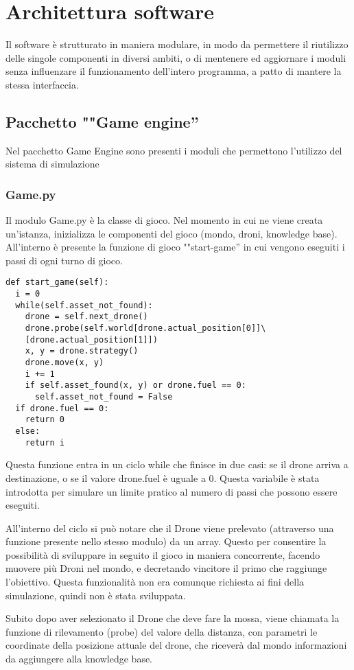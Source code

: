 	
\section{Architettura software}
Il software è strutturato in maniera modulare, in modo da permettere il riutilizzo delle singole componenti in diversi ambiti, o di mentenere ed aggiornare i moduli senza influenzare il funzionamento dell'intero programma, a patto di mantere la stessa interfaccia.

\subsection{Pacchetto ""Game engine''}
Nel pacchetto Game Engine sono presenti i moduli che permettono l'utilizzo del sistema di simulazione

\subsubsection{Game.py}
Il modulo Game.py è la classe di gioco. Nel momento in cui ne viene creata un'istanza, inizializza le componenti del gioco (mondo, droni, knowledge base). All'interno è presente la funzione di gioco ""start-game'' in cui vengono eseguiti i passi di ogni turno di gioco. 
\begin{verbatim}
def start_game(self):
  i = 0
  while(self.asset_not_found):
    drone = self.next_drone()
    drone.probe(self.world[drone.actual_position[0]]\
    [drone.actual_position[1]])
    x, y = drone.strategy()
    drone.move(x, y)
    i += 1
    if self.asset_found(x, y) or drone.fuel == 0:
      self.asset_not_found = False
  if drone.fuel == 0:
    return 0
  else:
    return i
\end{verbatim}
Questa funzione entra in un ciclo while che finisce in due casi: se il drone arriva a destinazione, o se il valore drone.fuel è uguale a 0. Questa variabile è stata introdotta per simulare un limite pratico al numero di passi che possono essere eseguiti. 

All'interno del ciclo si può notare che il Drone viene prelevato (attraverso una funzione presente nello stesso modulo) da un array. Questo per consentire la possibilità di sviluppare in seguito il gioco in maniera concorrente, facendo muovere più Droni nel mondo, e decretando vincitore il primo che raggiunge l'obiettivo. Questa funzionalità non era comunque richiesta ai fini della simulazione, quindi non è stata sviluppata.

Subito dopo aver selezionato il Drone che deve fare la mossa, viene chiamata la funzione di rilevamento (probe) del valore della distanza, con parametri le coordinate della posizione attuale del drone, che riceverà dal mondo informazioni da aggiungere alla knowledge base. 

